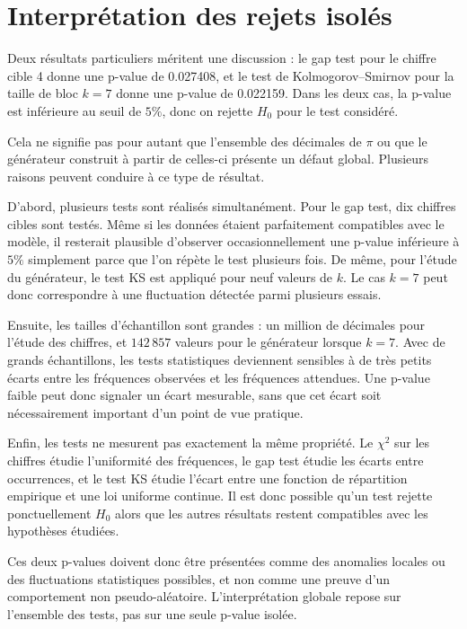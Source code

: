 \documentclass[11pt,a4paper]{report}
\begin{document}
\section{Interprétation des rejets isolés}

Deux résultats particuliers méritent une discussion : le gap test pour le chiffre cible 4 donne une p-value de 0.027408, et le test de Kolmogorov--Smirnov pour la taille de bloc $k=7$ donne une p-value de 0.022159. Dans les deux cas, la p-value est inférieure au seuil de $5\%$, donc on rejette $H_0$ pour le test considéré.

Cela ne signifie pas pour autant que l'ensemble des décimales de $\pi$ ou que le générateur construit à partir de celles-ci présente un défaut global. Plusieurs raisons peuvent conduire à ce type de résultat.

D'abord, plusieurs tests sont réalisés simultanément. Pour le gap test, dix chiffres cibles sont testés. Même si les données étaient parfaitement compatibles avec le modèle, il resterait plausible d'observer occasionnellement une p-value inférieure à $5\%$ simplement parce que l'on répète le test plusieurs fois. De même, pour l'étude du générateur, le test KS est appliqué pour neuf valeurs de $k$. Le cas $k=7$ peut donc correspondre à une fluctuation détectée parmi plusieurs essais.

Ensuite, les tailles d'échantillon sont grandes : un million de décimales pour l'étude des chiffres, et $142\,857$ valeurs pour le générateur lorsque $k=7$. Avec de grands échantillons, les tests statistiques deviennent sensibles à de très petits écarts entre les fréquences observées et les fréquences attendues. Une p-value faible peut donc signaler un écart mesurable, sans que cet écart soit nécessairement important d'un point de vue pratique.

Enfin, les tests ne mesurent pas exactement la même propriété. Le $\chi^2$ sur les chiffres étudie l'uniformité des fréquences, le gap test étudie les écarts entre occurrences, et le test KS étudie l'écart entre une fonction de répartition empirique et une loi uniforme continue. Il est donc possible qu'un test rejette ponctuellement $H_0$ alors que les autres résultats restent compatibles avec les hypothèses étudiées.

Ces deux p-values doivent donc être présentées comme des anomalies locales ou des fluctuations statistiques possibles, et non comme une preuve d'un comportement non pseudo-aléatoire. L'interprétation globale repose sur l'ensemble des tests, pas sur une seule p-value isolée.
\end{document}
